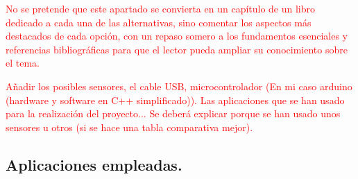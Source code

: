 \textcolor{red}{No se pretende que este apartado se convierta en un capítulo de un libro dedicado a cada una de las alternativas, sino comentar los aspectos más destacados de cada opción, con un repaso somero a los fundamentos esenciales y referencias bibliográficas para que el lector pueda ampliar su conocimiento sobre el tema.}

\textcolor{red}{Añadir los posibles sensores, el cable USB, microcontrolador (En mi caso arduino (hardware y software en C++ simplificado)). Las aplicaciones que se han usado para la realización del proyecto... Se deberá explicar porque se han usado unos sensores u otros (si se hace una tabla comparativa mejor). }

\subsection{Aplicaciones empleadas.}


